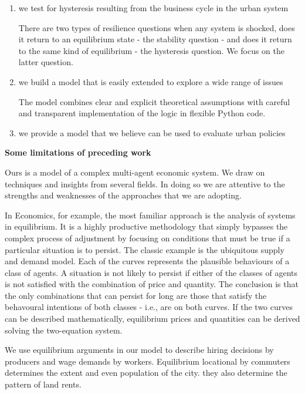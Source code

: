 \begin{enumerate}
    \item we test for hysteresis resulting from the business cycle   in the urban system 

There are two types of resilience questions when any system is shocked, does it return to an equilibrium state - the stability question - and does it return to the same kind of equilibrium - the hysteresis question. We focus on the latter question.  


    \item we build a model that is easily extended to explore a wide range of issues

The model combines clear and explicit theoretical assumptions with careful and transparent implementation of the logic in flexible Python code.

    \item we provide a model that we believe can be used  to evaluate urban policies


\end{enumerate}


% 


\textbf{Some limitations of preceding work}%

Ours is a  model of a complex multi-agent economic system. We draw on techniques and insights from several fields. In doing so we are attentive to the strengths and weaknesses of  the  approaches that we are adopting. 

In Economics, for example, the most familiar approach is the  analysis of systems in equilibrium. It is a highly productive methodology that simply bypasses the complex process of adjustment by focusing on conditions that must be true if a particular situation is to persist. The classic example is the ubiquitous supply and demand model. Each of the curves represents the plausible behaviours of a class of agents. A  situation is not likely to persist if either of the classes of agents is not satisfied with the combination of price and quantity. The conclusion   is that the only combinations that can persist for long are  those that satisfy the behavoural intentions of both classes - i.e., are on both curves. If the two curves can be described mathematically, equilibrium prices and quantities  can be derived solving the two-equation system.

We use  equilibrium arguments in our model to describe hiring decisions by producers and wage demands by workers. Equilibrium locational by commuters determines the extent and even population of the city. they also determine the pattern of land rents. 

